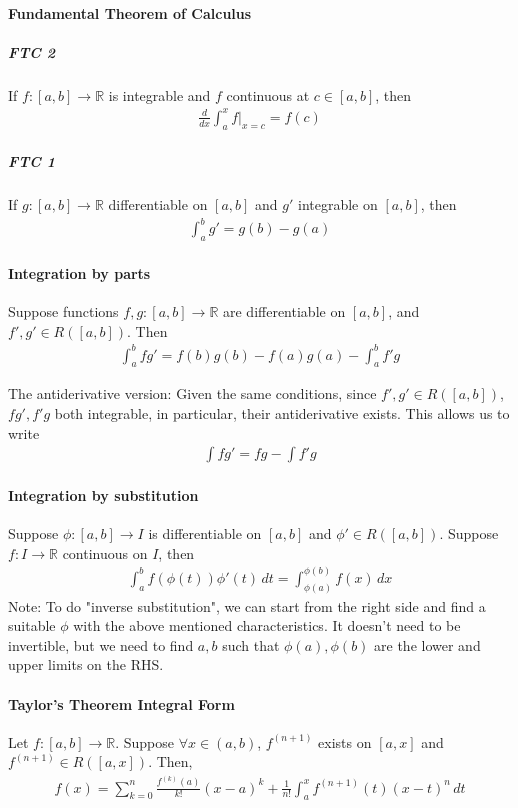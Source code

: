 \documentclass{article}
\begin{document}
\paragraph{Fundamental Theorem of Calculus}
\subparagraph{FTC 2}
If $f: [a,b]\rightarrow \mathbb{R}$ is integrable and $f$ continuous at $c\in [a,b]$, then
\begin{align*}
	\frac{d}{dx}\int_a^xf |_{x=c} = f(c)
\end{align*}

\subparagraph{FTC 1}
If $g: [a,b]\rightarrow \mathbb{R}$ differentiable on $[a,b]$ and $g'$ integrable on $[a,b]$, then
\begin{align*}
	\int_a^bg' = g(b)-g(a)
\end{align*}

\paragraph{Integration by parts}
Suppose functions $f,g:[a,b]\rightarrow \mathbb{R}$ are differentiable on $[a,b]$, and $f',g'\in R([a,b])$. Then
\begin{align*}
	\int_a^b fg' = f(b)g(b)-f(a)g(a)-\int_a^b f'g
\end{align*}

The antiderivative version: Given the same conditions, since $f',g'\in R([a,b])$, $fg', f'g$ both integrable, in particular, their antiderivative exists. This allows us to write
\begin{align*}
	\int fg' = fg - \int f'g
\end{align*}

\paragraph{Integration by substitution}
Suppose $\phi: [a,b]\rightarrow I$ is differentiable on $[a,b]$ and $\phi'\in R([a,b])$. Suppose $f: I\rightarrow \mathbb{R}$ continuous on $I$, then
\begin{align*}
	\int_a^b f(\phi(t))\phi'(t)\,dt = \int_{\phi(a)}^{\phi(b)}f(x)\,dx
\end{align*}
Note: To do "inverse substitution", we can start from the right side and find a suitable $\phi$ with the above mentioned characteristics. It doesn't need to be invertible, but we need to find $a,b$ such that $\phi(a), \phi(b)$ are the lower and upper limits on the RHS.

\paragraph{Taylor's Theorem Integral Form}
Let $f:[a,b]\rightarrow \mathbb{R}$. Suppose $\forall x\in (a,b)$, $f^(n+1)$ exists on $[a,x]$ and $f^{(n+1)}\in R([a,x])$. Then,
\begin{align*}
	f(x) = \sum_{k=0}^n\frac{f^{(k)}(a)}{k!}(x-a)^k + \frac{1}{n!}\int_a^xf^{(n+1)}(t)(x-t)^n\,dt
\end{align*}
\end{document}
